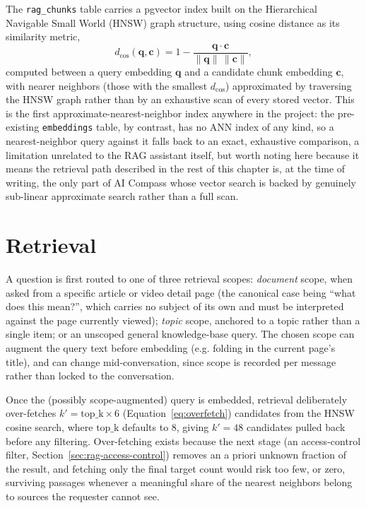 The \texttt{rag\_chunks} table carries a pgvector index built on the Hierarchical Navigable Small World (HNSW) graph structure, using cosine distance as its similarity metric,
\begin{equation}
  d_{\cos}(\mathbf{q}, \mathbf{c}) = 1 - \frac{\mathbf{q} \cdot \mathbf{c}}{\lVert \mathbf{q} \rVert \, \lVert \mathbf{c} \rVert},
  \label{eq:cosine-distance}
\end{equation}
computed between a query embedding $\mathbf{q}$ and a candidate chunk embedding $\mathbf{c}$, with nearer neighbors (those with the smallest $d_{\cos}$) approximated by traversing the HNSW graph rather than by an exhaustive scan of every stored vector. This is the first approximate-nearest-neighbor index anywhere in the project: the pre-existing \texttt{embeddings} table, by contrast, has no ANN index of any kind, so a nearest-neighbor query against it falls back to an exact, exhaustive comparison, a limitation unrelated to the RAG assistant itself, but worth noting here because it means the retrieval path described in the rest of this chapter is, at the time of writing, the only part of AI Compass whose vector search is backed by genuinely sub-linear approximate search rather than a full scan.

\section{Retrieval}
\label{sec:rag-retrieval}

A question is first routed to one of three retrieval scopes: \emph{document} scope, when asked from a specific article or video detail page (the canonical case being ``what does this mean?'', which carries no subject of its own and must be interpreted against the page currently viewed); \emph{topic} scope, anchored to a topic rather than a single item; or an unscoped general knowledge-base query. The chosen scope can augment the query text before embedding (e.g. folding in the current page's title), and can change mid-conversation, since scope is recorded per message rather than locked to the conversation.

Once the (possibly scope-augmented) query is embedded, retrieval deliberately over-fetches $k' = \text{top\_k} \times 6$ (Equation~\ref{eq:overfetch}) candidates from the HNSW cosine search, where $\text{top\_k}$ defaults to 8, giving $k'=48$ candidates pulled back before any filtering. Over-fetching exists because the next stage (an access-control filter, Section~\ref{sec:rag-access-control}) removes an a priori unknown fraction of the result, and fetching only the final target count would risk too few, or zero, surviving passages whenever a meaningful share of the nearest neighbors belong to sources the requester cannot see.

